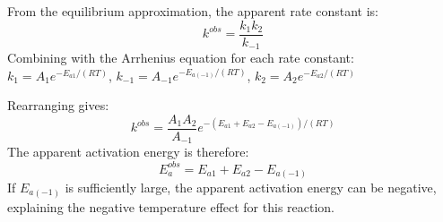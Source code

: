 \begin{example}
From the equilibrium approximation, the apparent rate constant is:
$$k^{obs} = \frac{k_1 k_2}{k_{-1}}$$
Combining with the Arrhenius equation for each rate constant: $k_1 = A_1 e^{-E_{a1}/(RT)}$, $k_{-1} = A_{-1} e^{-E_{a(-1)}/(RT)}$, $k_2 = A_2 e^{-E_{a2}/(RT)}$

Rearranging gives:
$$k^{obs} = \frac{A_1 A_2}{A_{-1}} e^{-(E_{a1} + E_{a2} - E_{a(-1)})/(RT)}$$
The apparent activation energy is therefore:
$$E_a^{obs} = E_{a1} + E_{a2} - E_{a(-1)}$$
If $E_{a(-1)}$ is sufficiently large, the apparent activation energy can be negative, explaining the negative temperature effect for this reaction.
\end{example}


\newpage
